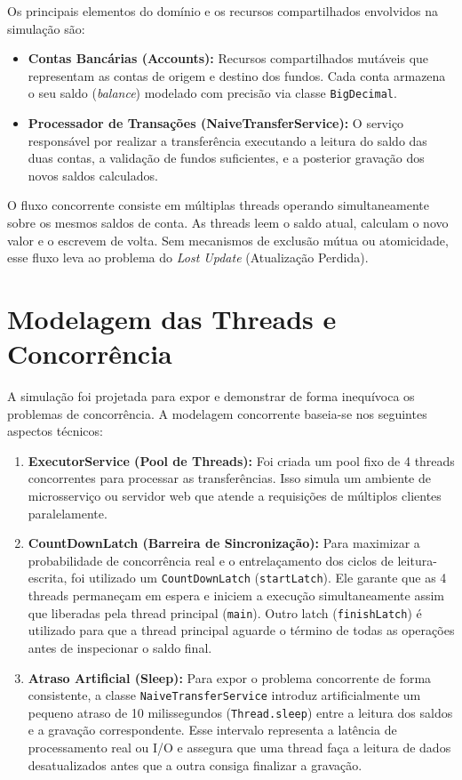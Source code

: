 \documentclass[12pt,a4paper]{article}
\begin{document}
\noindent Os principais elementos do domínio e os recursos compartilhados envolvidos na simulação são:
\begin{itemize}
    \item \textbf{Contas Bancárias (Accounts):} Recursos compartilhados mutáveis que representam as contas de origem e destino dos fundos. Cada conta armazena o seu saldo (\textit{balance}) modelado com precisão via classe \texttt{BigDecimal}.
    \item \textbf{Processador de Transações (NaiveTransferService):} O serviço responsável por realizar a transferência executando a leitura do saldo das duas contas, a validação de fundos suficientes, e a posterior gravação dos novos saldos calculados.
\end{itemize}

\noindent O fluxo concorrente consiste em múltiplas threads operando simultaneamente sobre os mesmos saldos de conta. As threads leem o saldo atual, calculam o novo valor e o escrevem de volta. Sem mecanismos de exclusão mútua ou atomicidade, esse fluxo leva ao problema do \textit{Lost Update} (Atualização Perdida).

\section{Modelagem das Threads e Concorrência}

\noindent A simulação foi projetada para expor e demonstrar de forma inequívoca os problemas de concorrência. A modelagem concorrente baseia-se nos seguintes aspectos técnicos:

\begin{enumerate}
    \item \textbf{ExecutorService (Pool de Threads):} Foi criada um pool fixo de 4 threads concorrentes para processar as transferências. Isso simula um ambiente de microsserviço ou servidor web que atende a requisições de múltiplos clientes paralelamente.
    \item \textbf{CountDownLatch (Barreira de Sincronização):} Para maximizar a probabilidade de concorrência real e o entrelaçamento dos ciclos de leitura-escrita, foi utilizado um \texttt{CountDownLatch} (\texttt{startLatch}). Ele garante que as 4 threads permaneçam em espera e iniciem a execução simultaneamente assim que liberadas pela thread principal (\texttt{main}). Outro latch (\texttt{finishLatch}) é utilizado para que a thread principal aguarde o término de todas as operações antes de inspecionar o saldo final.
    \item \textbf{Atraso Artificial (Sleep):} Para expor o problema concorrente de forma consistente, a classe \texttt{NaiveTransferService} introduz artificialmente um pequeno atraso de 10 milissegundos (\texttt{Thread.sleep}) entre a leitura dos saldos e a gravação correspondente. Esse intervalo representa a latência de processamento real ou I/O e assegura que uma thread faça a leitura de dados desatualizados antes que a outra consiga finalizar a gravação.
\end{enumerate}
\end{document}
